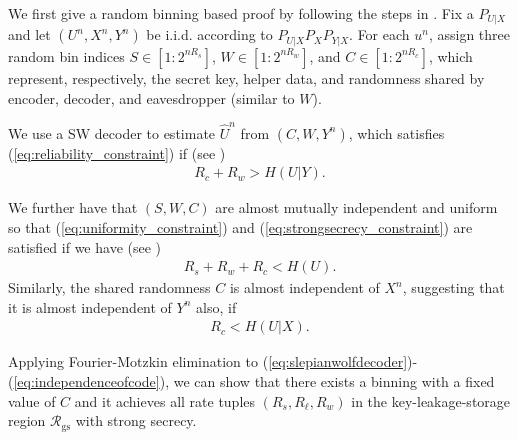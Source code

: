 \documentclass[journal,10pt,twoside]{IEEEtran}
\begin{document}
\begin{IEEEproof}We first give a random binning based proof by following the steps in \cite{OSRBAmin}. Fix a $\displaystyle P_{U|X}$ and let $(U^n,X^n,Y^n)$ be i.i.d. according to $P_{U|X}P_XP_{Y|X}$. For each $u^n$, assign three random bin indices $S\in[1:2^{nR_s}]$, $W\in[1:2^{nR_w}]$, and $C\in[1:2^{nR_c}]$, which represent, respectively, the secret key, helper data, and randomness shared by encoder, decoder, and eavesdropper (similar to $W$). 
	
We use a SW decoder to estimate $\widehat{U}^n$ from $(C,W,Y^n)$, which satisfies (\ref{eq:reliability_constraint}) if (see \cite[Lemma 1]{OSRBAmin})
\begin{align}
	R_c+R_w> H(U|Y). \label{eq:slepianwolfdecoder}
\end{align}
	
We further have that $(S,W,C)$ are almost mutually independent and uniform so that (\ref{eq:uniformity_constraint}) and (\ref{eq:strongsecrecy_constraint}) are satisfied if we have (see \cite[Theorem 1]{OSRBAmin})
\begin{align}
	R_s+R_w+R_c< H(U).\label{eq:independenceofindices}
\end{align}
Similarly, the shared randomness $C$ is almost independent of $X^n$, suggesting that it is almost independent of $Y^n$ also, if 
\begin{align}
	R_c<H(U|X).\label{eq:independenceofcode}
\end{align} 
	
Applying Fourier-Motzkin elimination \cite[Section 12.2]{FourierMotzkin} to (\ref{eq:slepianwolfdecoder})-(\ref{eq:independenceofcode}), we can show that there exists a binning with a fixed value of $C$ and it achieves all rate tuples $(R_s,R_{\ell},R_w)$ in the key-leakage-storage region $\mathcal{R}_{\text{gs}}$ with strong secrecy. 
\end{IEEEproof}
\end{document}
